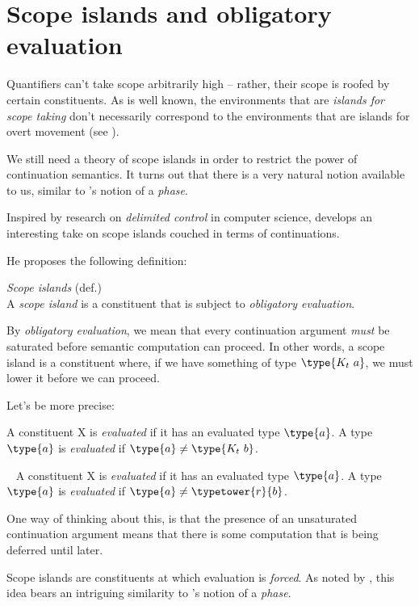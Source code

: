 \documentclass[nols,twoside,nofonts,nobib,nohyper]{tufte-handout}
\begin{document}
\section{Scope islands and obligatory evaluation}

Quantifiers can't take scope arbitrarily high -- rather, their scope is roofed
by certain constituents. As is well known, the environments that are
\textit{islands for scope taking} don't necessarily correspond to the
environments that are islands for overt movement (see \citealt{may}).

We still need a theory of scope islands in order to restrict the power of
continuation semantics. It turns out that there is a very natural notion
available to us, similar to \citeauthor{chomsky1995}'s notion of a \textit{phase}.

Inspired by research on \textit{delimited control} in computer
science,
\citet{Charlowc} develops an interesting take on scope islands couched in terms
of continuations.

He proposes the following definition:

\ex
\textit{Scope islands} (def.)\\
A \textit{scope island} is a constituent that is subject to \textit{obligatory
  evaluation}.\\
\phantom{,}\hfill\citep[p. 90]{Charlowc}
\xe

By \textit{obligatory evaluation}, we mean that every continuation argument
\textit{must} be saturated before semantic computation can proceed. In other
words, a scope island is a constituent where, if we have something of type
$\type{K_{t} a}$, we must lower it before we can proceed.

Let's be more precise:

\pex
\a A constituent X is \textit{evaluated} if it has an evaluated type $\type{a}$.
\a A type $\type{a}$ is \textit{evaluated} if $\type{a} \neq \type{K_{t} b}$.
\xe

\pex~
\a A constituent X is \textit{evaluated} if it has an evaluated type $\type{a}$.
\a A type $\type{a}$ is \textit{evaluated} if $\type{a} \neq \typetower{r}{b}$.
\xe


One way of thinking about this, is that the presence of an unsaturated
continuation argument means that there is some computation that is being
deferred until later.

Scope islands are constituents at which evaluation is
\textit{forced}. As noted by \citeauthor{Charlowc}, this idea bears an
intriguing similarity to \citeauthor{chomskyPhase}'s notion of a
\textit{phase}.
\end{document}
